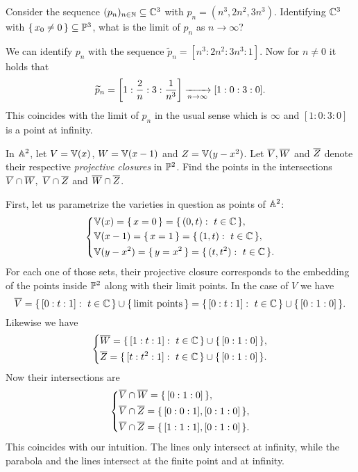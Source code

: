\documentclass[12pt]{memoir}
\begin{document}
  \begin{Ej}
    Consider the sequence $(p_n)_{n\in\mathbb{N}}\subseteq\mathbb{C}^3$ with $p_n=(n^3,2n^2,3n^3)$. Identifying $\mathbb{C}^3$ with $\{\,x_0\neq 0\,\}\subseteq\mathbb{P}^3$, what is the limit of $p_n$ as $n\to\infty$?
   \end{Ej}

  \begin{ptcbr}
    We can identify $p_n$ with the sequence $\widetilde{p}_n=[n^3:2n^2:3n^3:1]$. Now for $n\neq 0$ it holds that 
    $$\widetilde{p}_n=\left\lbrack1:\frac2n:3:\frac{1}{n^3}\right\rbrack\xrightarrow[n\to\infty]{}[1:0:3:0].$$
    This coincides with the limit of $p_n$ in the usual sense which is $\infty$ and $[1:0:3:0]$ is a point at infinity.
  \end{ptcbr}

  \begin{Ej}
    In $\mathbb{A}^2$, let $V=\mathbb{V}(x)$, $W=\mathbb{V}(x-1)$ and $Z=\mathbb{V}(y-x^2)$. Let $\overline V,\overline W$ and $\overline Z$ denote their respective \emph{projective closures} in $\mathbb{P}^2$. Find the points in the intersections $\overline V\cap \overline W,\ \overline V\cap \overline Z$ and $\overline W\cap \overline Z$.
  \end{Ej}

  \begin{ptcbr}
    First, let us parametrize the varieties in question as points of $\mathbb{A}^2$:
    $$
    \left\lbrace
    \begin{aligned}
      &\mathbb{V}(x)=\{\,x=0\,\}=\{\,(0,t):\ t\in\mathbb{C}\,\},\\
      &\mathbb{V}(x-1)=\{\,x=1\,\}=\{\,(1,t):\ t\in\mathbb{C}\,\},\\
      &\mathbb{V}(y-x^2)=\{\,y=x^2\,\}=\{\,(t,t^2):\ t\in\mathbb{C}\,\}.
    \end{aligned}
    \right.
    $$
    For each one of those sets, their projective closure corresponds to the embedding of the points inside $\mathbb{P}^2$ along with their limit points. In the case of $V$ we have 
    $$\ov V=\set{[0:t:1]:\ t\in\bC}\cup\set{\text{limit points}}=\set{[0:t:1]:\ t\in\bC}\cup\set{[0:1:0]}.$$
    Likewise we have 
    $$
    \left\lbrace
    \begin{aligned}
      &\overline W=\{\,[1:t:1]:\ t\in\mathbb{C}\,\}\cup\{\,[0:1:0]\,\},\\
      &\overline Z=\{\,[t:t^2:1]:\ t\in\mathbb{C}\,\}\cup\{\,[0:1:0]\,\}.
    \end{aligned}
    \right.
    $$
    Now their intersections are 
    $$
    \left\lbrace
    \begin{aligned}
      &\overline V\cap \overline W=\{\,[0:1:0]\,\},\\
      &\overline V\cap \overline Z=\{\,[0:0:1],[0:1:0]\,\},\\
      &\overline V\cap \overline Z=\{\,[1:1:1],[0:1:0]\,\}.
    \end{aligned}
    \right.
    $$
    This coincides with our intuition. The lines only intersect at infinity, while the parabola and the lines intersect at the finite point and at infinity.
  \end{ptcbr}
\end{document}
